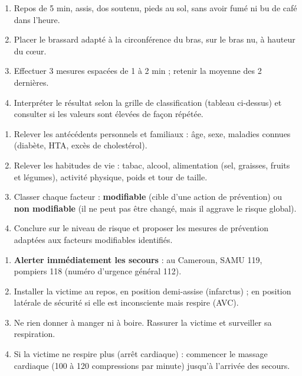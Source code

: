\documentclass[11pt]{article}
\newcounter{popsec}
\newcounter{popsub}
\newcommand{\courssub}[1]{%
  \stepcounter{popsub}%
  \par\vspace{9pt}\noindent{\popxbold\fontsize{11.5}{13}\selectfont\color{popink}{\color{poporange}\thepopsec.\thepopsub}\hspace{6pt}#1}\par\nopagebreak\vspace{4pt}
}
\begin{document}
\courssub{Méthodes express}

\begin{methode}
\begin{enumerate}
  \item Repos de 5 min, assis, dos soutenu, pieds au sol, sans avoir fumé ni bu de café dans l'heure.
  \item Placer le brassard adapté à la circonférence du bras, sur le bras nu, à hauteur du cœur.
  \item Effectuer 3 mesures espacées de 1 à 2 min ; retenir la moyenne des 2 dernières.
  \item Interpréter le résultat selon la grille de classification (tableau ci-dessus) et consulter si les valeurs sont élevées de façon répétée.
\end{enumerate}
\end{methode}

\begin{methode}
\begin{enumerate}
  \item Relever les antécédents personnels et familiaux : âge, sexe, maladies connues (diabète, HTA, excès de cholestérol).
  \item Relever les habitudes de vie : tabac, alcool, alimentation (sel, graisses, fruits et légumes), activité physique, poids et tour de taille.
  \item Classer chaque facteur : \textbf{modifiable} (cible d'une action de prévention) ou \textbf{non modifiable} (il ne peut pas être changé, mais il aggrave le risque global).
  \item Conclure sur le niveau de risque et proposer les mesures de prévention adaptées aux facteurs modifiables identifiés.
\end{enumerate}
\end{methode}

\begin{methode}
\begin{enumerate}
  \item \textbf{Alerter immédiatement les secours} : au Cameroun, SAMU 119, pompiers 118 (numéro d'urgence général 112).
  \item Installer la victime au repos, en position demi-assise (infarctus) ; en position latérale de sécurité si elle est inconsciente mais respire (AVC).
  \item Ne rien donner à manger ni à boire. Rassurer la victime et surveiller sa respiration.
  \item Si la victime ne respire plus (arrêt cardiaque) : commencer le massage cardiaque (100 à 120 compressions par minute) jusqu'à l'arrivée des secours.
\end{enumerate}
\end{methode}
\end{document}
